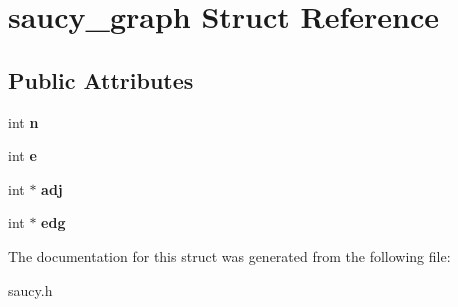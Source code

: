 \hypertarget{structsaucy__graph}{\section{saucy\-\_\-graph Struct Reference}
\label{structsaucy__graph}
}
\subsection*{Public Attributes}
\begin{DoxyCompactItemize}
\item 
\hypertarget{structsaucy__graph_afeb103fea03d7425bc29f286017e1050}{int {\bfseries n}}\label{structsaucy__graph_afeb103fea03d7425bc29f286017e1050}

\item 
\hypertarget{structsaucy__graph_a42d7a4a649a18c85740ec2b03c51762f}{int {\bfseries e}}\label{structsaucy__graph_a42d7a4a649a18c85740ec2b03c51762f}

\item 
\hypertarget{structsaucy__graph_aa19c0d5222c0281f25757befd6fcaa4c}{int $\ast$ {\bfseries adj}}\label{structsaucy__graph_aa19c0d5222c0281f25757befd6fcaa4c}

\item 
\hypertarget{structsaucy__graph_aee3c06170c9790cc78d4035a28c919a3}{int $\ast$ {\bfseries edg}}\label{structsaucy__graph_aee3c06170c9790cc78d4035a28c919a3}

\end{DoxyCompactItemize}


The documentation for this struct was generated from the following file\-:\begin{DoxyCompactItemize}
\item 
saucy.\-h\end{DoxyCompactItemize}
